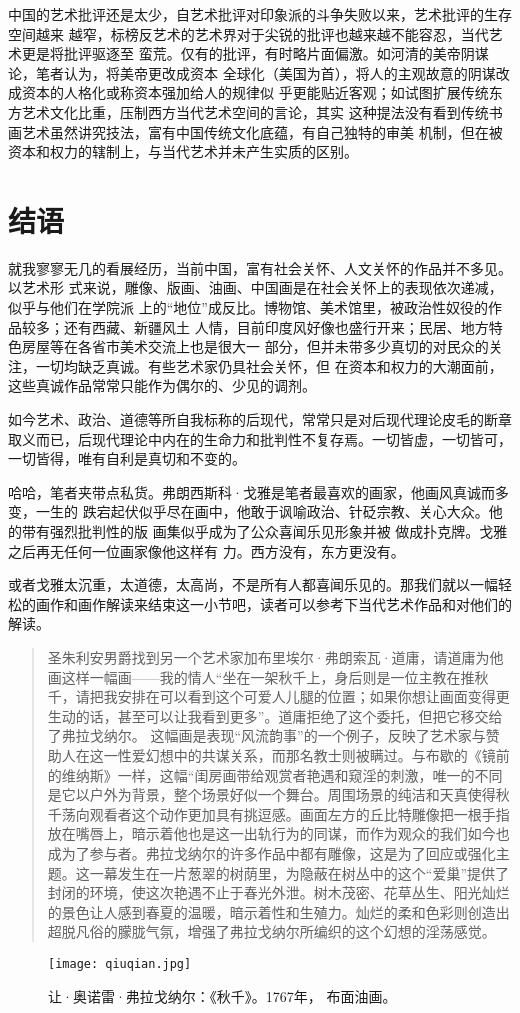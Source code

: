 中国的艺术批评还是太少，自艺术批评对印象派的斗争失败以来，艺术批评的生存空间越来
越窄，标榜反艺术的艺术界对于尖锐的批评也越来越不能容忍，当代艺术更是将批评驱逐至
蛮荒。仅有的批评，有时略片面偏激。如河清的美帝阴谋论，笔者认为，将美帝更改成资本
全球化（美国为首），将人的主观故意的阴谋改成资本的人格化或称资本强加给人的规律似
乎更能贴近客观；如试图扩展传统东方艺术文化比重，压制西方当代艺术空间的言论，其实
这种提法没有看到传统书画艺术虽然讲究技法，富有中国传统文化底蕴，有自己独特的审美
机制，但在被资本和权力的辖制上，与当代艺术并未产生实质的区别。


\section{结语}

就我寥寥无几的看展经历，当前中国，富有社会关怀、人文关怀的作品并不多见。以艺术形
式来说，雕像、版画、油画、中国画是在社会关怀上的表现依次递减，似乎与他们在学院派
上的“地位”成反比。博物馆、美术馆里，被政治性奴役的作品较多；还有西藏、新疆风土
人情，目前印度风好像也盛行开来；民居、地方特色房屋等在各省市美术交流上也是很大一
部分，但并未带多少真切的对民众的关注，一切均缺乏真诚。有些艺术家仍具社会关怀，但
在资本和权力的大潮面前，这些真诚作品常常只能作为偶尔的、少见的调剂。

如今艺术、政治、道德等所自我标称的后现代，常常只是对后现代理论皮毛的断章取义而已，后现代理论中内在的生命力和批判性不复存焉。一切皆虚，一切皆可，一切皆得，唯有自利是真切和不变的。

哈哈，笔者夹带点私货。弗朗西斯科·戈雅是笔者最喜欢的画家，他画风真诚而多变，一生的
跌宕起伏似乎尽在画中，他敢于讽喻政治、针砭宗教、关心大众。他的带有强烈批判性的版
画集似乎成为了公众喜闻乐见形象并被 做成扑克牌。戈雅之后再无任何一位画家像他这样有
力。西方没有，东方更没有。

或者戈雅太沉重，太道德，太高尚，不是所有人都喜闻乐见的。那我们就以一幅轻松的画作和画作解读来结束这一小节吧，读者可以参考下当代艺术作品和对他们的解读。

\begin{quotation}
  圣朱利安男爵找到另一个艺术家加布里埃尔·弗朗索瓦·道庸，请道庸为他画这样一幅画——我的情人“坐在一架秋千上，身后则是一位主教在推秋千，请把我安排在可以看到这个可爱人儿腿的位置；如果你想让画面变得更生动的话，甚至可以让我看到更多”。道庸拒绝了这个委托，但把它移交给了弗拉戈纳尔。
  这幅画是表现“风流韵事”的一个例子，反映了艺术家与赞助人在这一性爱幻想中的共谋关系，而那名教士则被瞒过。与布歇的《镜前的维纳斯》一样，这幅“闺房画带给观赏者艳遇和窥淫的刺激，唯一的不同是它以户外为背景，整个场景好似一个舞台。周围场景的纯洁和天真使得秋千荡向观看者这个动作更加具有挑逗感。画面左方的丘比特雕像把一根手指放在嘴唇上，暗示着他也是这一出轨行为的同谋，而作为观众的我们如今也成为了参与者。弗拉戈纳尔的许多作品中都有雕像，这是为了回应或强化主题。这一幕发生在一片葱翠的树荫里，为隐蔽在树丛中的这个“爱巢”提供了封闭的环境，使这次艳遇不止于春光外泄。树木茂密、花草丛生、阳光灿烂的景色让人感到春夏的温暖，暗示着性和生殖力。灿烂的柔和色彩则创造出超脱凡俗的朦胧气氛，增强了弗拉戈纳尔所编织的这个幻想的淫荡感觉。
\end{quotation}

\clearpage
\begin{figure}[t]
  \centering
  \texttt{[image: qiuqian.jpg]}
  \caption[让·奥诺雷·弗拉戈纳尔：《秋千》]{让·奥诺雷·弗拉戈纳尔：《秋千》。1767年，
    布面油画。}\label{fig:qiuqian}
\end{figure}

